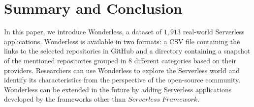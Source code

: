 \section{Summary and Conclusion}
\label{summary}

In this paper, we introduce Wonderless, a dataset of $1,913$ 
real-world Serverless applications. Wonderless is available in two 
formats: a CSV file containing the links to the selected repositories 
in GitHub and a directory containing a snapshot of the mentioned 
repositories grouped in 8 different categories based on their providers. 
Researchers can use Wonderless to explore the Serverless world and 
identify its characteristics from the perspective of the open-source 
community. Wonderless can be extended in the future by adding 
Serverless applications developed by the frameworks other than 
$Serverless \; Framework$.

